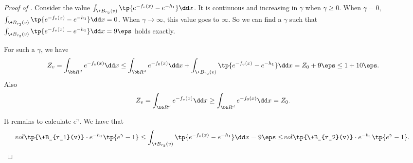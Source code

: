 \begin{proof}[Proof of ]
    Consider the value $\int_{\+B_{r_2}(v)} \tp{e^{-f_v(x)} - e^{-h_1}}\dd x$. It is continuous and increasing in $\gamma$ when $\gamma\ge 0$. When $\gamma = 0$, $\int_{\+B_{r_2}(v)} \tp{e^{-f_v(x)} - e^{-h_1}}\dd x = 0$. When $\gamma \to \infty $, this value goes to $\infty$. So we can find a $\gamma$ such that $\int_{\+B_{r_2}(v)} \tp{e^{-f_v(x)} - e^{-h_1}}\dd x = 9\eps$ holds exactly.

    For such a $\gamma$, we have
    \[
        Z_v = \int_{\bb R^d} e^{-f_v(x)} \dd x \leq \int_{\bb R^d} e^{-f_0(x)} \dd x + \int_{\+B_{r_2}(v)} \tp{ e^{-f_v(x)} - e^{-h_1}}\dd x = Z_0+9\eps \leq 1+10\eps.
    \]
    Also
    $$
        Z_v = \int_{\bb R^d} e^{-f_v(x)} \dd x \geq \int_{\bb R^d} e^{-f_0(x)} \dd x = Z_0.
    $$
    

    
    It remains to calculate $e^\gamma$. We have that
    \[
        \vol\tp{\+B_{r_1}(v)} \cdot e^{-h_1} \tp{e^\gamma - 1}\leq \int_{\+B_{r_2}(v)} \tp{e^{-f_v(x)} - e^{-h_1}}  \dd x =9\eps \leq \vol\tp{\+B_{r_2}(v)} \cdot e^{-h_1} \tp{e^\gamma - 1}.
    \]
\end{proof}

